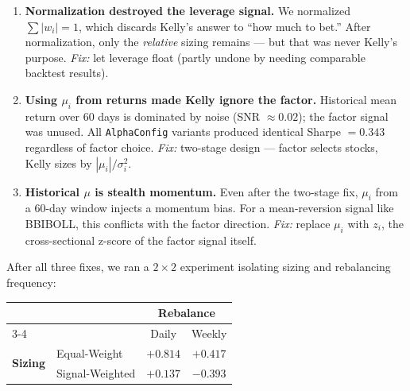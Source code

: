 \documentclass[a4paper, 11pt]{report}
\theoremstyle{definition}
\theoremstyle{remark}
\begin{document}
\begin{description}[style=nextline, leftmargin=1.8cm]
    \item[The Three Bugs We Hit (and Fixed)]
        \begin{enumerate}[nosep]
            \item \textbf{Normalization destroyed the leverage signal.}
                  We normalized $\sum|w_i| = 1$, which discards Kelly's
                  answer to ``how much to bet.''  After normalization,
                  only the \emph{relative} sizing remains --- but that
                  was never Kelly's purpose.
                  \emph{Fix:} let leverage float (partly undone by
                  needing comparable backtest results).
            \item \textbf{Using $\mu_i$ from returns made Kelly ignore
                  the factor.}
                  Historical mean return over 60 days is dominated by
                  noise (SNR $\approx 0.02$); the factor signal was
                  unused.  All \texttt{AlphaConfig} variants produced
                  identical Sharpe $= 0.343$ regardless of factor
                  choice.
                  \emph{Fix:} two-stage design --- factor selects
                  stocks, Kelly sizes by $|\mu_i| / \sigma_i^2$.
            \item \textbf{Historical $\mu$ is stealth momentum.}
                  Even after the two-stage fix, $\mu_i$ from a 60-day
                  window injects a momentum bias.  For a mean-reversion
                  signal like BBIBOLL, this conflicts with the factor
                  direction.
                  \emph{Fix:} replace $\mu_i$ with $z_i$, the
                  cross-sectional z-score of the factor signal itself.
        \end{enumerate}

    \item[The Ablation Study]
        After all three fixes, we ran a $2 \times 2$ experiment
        isolating sizing and rebalancing frequency:
        \begin{center}
        \begin{tabular}{@{}llcc@{}}
        \toprule
        & & \multicolumn{2}{c}{\textbf{Rebalance}} \\
        \cmidrule(l){3-4}
        & & Daily & Weekly \\
        \midrule
        \multirow{2}{*}{\textbf{Sizing}}
        & Equal-Weight      & $+0.814$ & $+0.417$ \\
        & Signal-Weighted   & $+0.137$ & $-0.393$ \\
        \bottomrule
        \end{tabular}
        \end{center}


\end{description}
\end{document}
